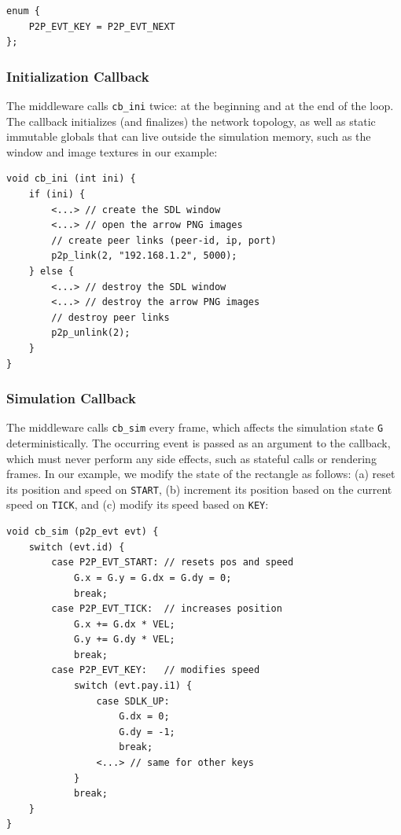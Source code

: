 \documentclass[10pt,journal,compsoc]{IEEEtran}
\newcommand{\code}[1]  {\texttt{\footnotesize{#1}}}
\begin{document}
{\footnotesize
\begin{verbatim}
enum {
    P2P_EVT_KEY = P2P_EVT_NEXT
};
\end{verbatim}
}

\subsubsection{Initialization Callback}
\label{sec.tml.api.cb_ini}

The middleware calls \code{cb\_ini} twice: at the beginning and at the end of
the loop.
The callback initializes (and finalizes) the network topology, as well as
static immutable globals that can live outside the simulation memory, such as
the window and image textures in our example:

{\footnotesize
\begin{verbatim}
void cb_ini (int ini) {
    if (ini) {
        <...> // create the SDL window
        <...> // open the arrow PNG images
        // create peer links (peer-id, ip, port)
        p2p_link(2, "192.168.1.2", 5000);
    } else {
        <...> // destroy the SDL window
        <...> // destroy the arrow PNG images
        // destroy peer links
        p2p_unlink(2);
    }
}
\end{verbatim}
}

\subsubsection{Simulation Callback}
\label{sec.tml.api.cb_sim}

The middleware calls \code{cb\_sim} every frame, which affects the simulation
state \code{G} deterministically.
The occurring event is passed as an argument to the callback, which must never
perform any side effects, such as stateful calls or rendering frames.
In our example, we modify the state of the rectangle as follows:
    (a) reset its position and speed on \code{START},
    (b) increment its position based on the current speed on \code{TICK}, and
    (c) modify its speed based on \code{KEY}:

{\footnotesize
\begin{verbatim}
void cb_sim (p2p_evt evt) {
    switch (evt.id) {
        case P2P_EVT_START: // resets pos and speed
            G.x = G.y = G.dx = G.dy = 0;
            break;
        case P2P_EVT_TICK:  // increases position
            G.x += G.dx * VEL;
            G.y += G.dy * VEL;
            break;
        case P2P_EVT_KEY:   // modifies speed
            switch (evt.pay.i1) {
                case SDLK_UP:
                    G.dx = 0;
                    G.dy = -1;
                    break;
                <...> // same for other keys
            }
            break;
    }
}
\end{verbatim}
}
\end{document}
